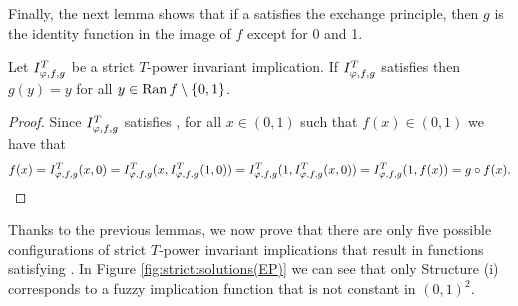 Finally, the next lemma shows that if  a \STP \IT satisfies the exchange principle, then $g$ is the identity function in the image of $f$ except for 0 and 1.
\begin{lemma}\label{lem:strict:g(EP)} Let $I^T_{\varphi,f,g}$ be a strict $T$-power invariant implication. If $I^T_{\varphi,f,g}$ satisfies \EP then $g(y)=y$ for all $y \in \operatorname{Ran} f \setminus \{0,1\}$.
\end{lemma}
\begin{proof} Since $I^T_{\varphi,f,g}$ satisfies \EP, for all $x \in(0,1)$ such that $f(x) \in (0,1)$ we have that
	$$f(x)=I^T_{\varphi,f,g}(x,0)=I^T_{\varphi,f,g}(x,I^T_{\varphi,f,g}(1,0))=I^T_{\varphi,f,g}(1,I^T_{\varphi,f,g}(x,0))=I^T_{\varphi,f,g}(1,f(x))=g \circ f(x).$$
\end{proof}
Thanks to the previous lemmas, we now prove that there are only five possible configurations of strict $T$-power invariant implications that result in functions satisfying \EP. In Figure \ref{fig:strict:solutions(EP)} we can see that only Structure (i) corresponds to a fuzzy implication function that is not constant in $(0,1)^2$.

